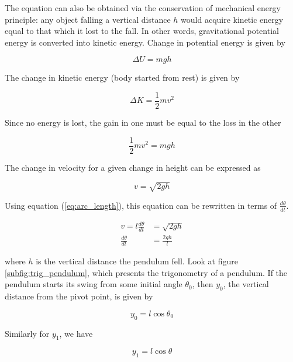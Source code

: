 The equation can also be obtained via the conservation of mechanical energy
principle: any object falling a vertical distance $h$ would acquire kinetic
energy equal to that which it lost to the fall. In other words, gravitational
potential energy is converted into kinetic energy. Change in potential energy is
given by

\begin{equation*}
  \Delta U = mgh
\end{equation*}

The change in kinetic energy (body started from rest) is given by

\begin{equation*}
  \Delta K = \frac{1}{2}mv^2
\end{equation*}

Since no energy is lost, the gain in one must be equal to the loss in the other

\begin{equation*}
  \frac{1}{2}mv^2 = mgh
\end{equation*}

The change in velocity for a given change in height can be expressed as

\begin{equation*}
  v = \sqrt{2gh}
\end{equation*}

Using equation (\ref{eq:arc_length}), this equation can be rewritten in terms of
$\frac{d\theta}{dt}$.

\begin{align}
  v = l\frac{d\theta}{dt} &= \sqrt{2gh} \nonumber \\
  \frac{d\theta}{dt} &= \frac{2gh}{l} \label{eq:energy_dtheta}
\end{align}

where $h$ is the vertical distance the pendulum fell. Look at figure \ref{subfig:trig_pendulum}, which presents the trigonometry of a pendulum. If the pendulum
starts its swing from some initial angle $\theta_0$, then $y_0$, the vertical
distance from the pivot point, is given by

\begin{equation*}
  y_0 = l\cos\theta_0
\end{equation*}

Similarly for $y_1$, we have

\begin{equation*}
  y_1 = l\cos\theta
\end{equation*}

